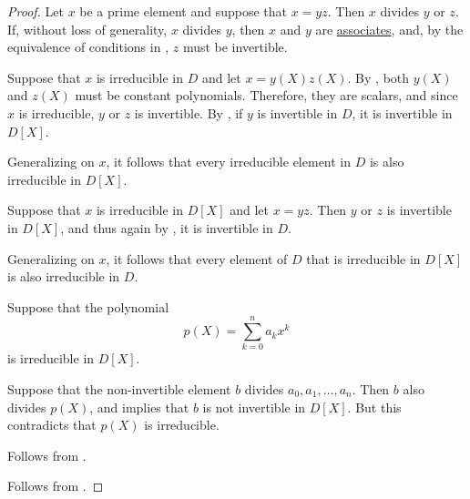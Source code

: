 \begin{proof}
   Let \( x \) be a prime element and suppose that \( x = yz \). Then \( x \) divides \( y \) or \( z \). If, without loss of generality, \( x \) divides \( y \), then \( x \) and \( y \) are \hyperref[def:domain_divisibility/associates]{associates}, and, by the equivalence of conditions in , \( z \) must be invertible.


  \SufficiencySubProof* Suppose that \( x \) is irreducible in \( D \) and let \( x = y(X) z(X) \). By , both \( y(X) \) and \( z(X) \) must be constant polynomials. Therefore, they are scalars, and since \( x \) is irreducible, \( y \) or \( z \) is invertible. By , if \( y \) is invertible in \( D \), it is invertible in \( D[X] \).

  Generalizing on \( x \), it follows that every irreducible element in \( D \) is also irreducible in \( D[X] \).

  \NecessitySubProof* Suppose that \( x \) is irreducible in \( D[X] \) and let \( x = yz \). Then \( y \) or \( z \) is invertible in \( D[X] \), and thus again by , it is invertible in \( D \).

  Generalizing on \( x \), it follows that every element of \( D \) that is irreducible in \( D[X] \) is also irreducible in \( D \).

   Suppose that the polynomial
  \begin{equation*}
    p(X) = \sum_{k=0}^n a_k x^k
  \end{equation*}
  is irreducible in \( D[X] \).

  Suppose that the non-invertible element \( b \) divides \( a_0, a_1, \ldots, a_n \). Then \( b \) also divides \( p(X) \), and  implies that \( b \) is not invertible in \( D[X] \). But this contradicts that \( p(X) \) is irreducible.

   Follows from .

   Follows from .
\end{proof}

